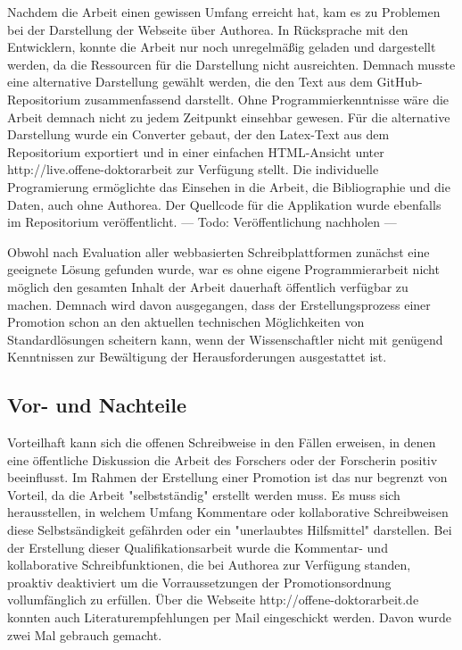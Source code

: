 Nachdem die Arbeit einen gewissen Umfang erreicht hat, kam es zu Problemen bei der Darstellung der Webseite über Authorea. In Rücksprache mit den Entwicklern, konnte die Arbeit nur noch unregelmäßig geladen und dargestellt werden, da die Ressourcen für die Darstellung nicht ausreichten. Demnach musste eine alternative Darstellung gewählt werden, die den Text aus dem GitHub-Repositorium zusammenfassend darstellt. Ohne Programmierkenntnisse wäre die Arbeit demnach nicht zu jedem Zeitpunkt einsehbar gewesen. Für die alternative Darstellung wurde ein Converter gebaut, der den Latex-Text aus dem Repositorium exportiert und in einer einfachen HTML-Ansicht unter http://live.offene-doktorarbeit zur Verfügung stellt. Die individuelle Programierung ermöglichte das Einsehen in die Arbeit, die Bibliographie und die Daten, auch ohne Authorea. Der Quellcode für die Applikation wurde ebenfalls im Repositorium veröffentlicht. --- Todo: Veröffentlichung nachholen ---

Obwohl nach Evaluation aller webbasierten Schreibplattformen zunächst eine geeignete Lösung gefunden wurde, war es ohne eigene Programmierarbeit nicht möglich den gesamten Inhalt der Arbeit dauerhaft öffentlich verfügbar zu machen. Demnach wird davon ausgegangen, dass der Erstellungsprozess einer Promotion schon an den aktuellen technischen Möglichkeiten von Standardlösungen scheitern kann, wenn der Wissenschaftler nicht mit genügend Kenntnissen zur Bewältigung der Herausforderungen ausgestattet ist.

\subsection{Vor- und Nachteile}

Vorteilhaft kann sich die offenen Schreibweise in den Fällen erweisen, in denen eine öffentliche Diskussion die Arbeit des Forschers oder der Forscherin positiv beeinflusst. Im Rahmen der Erstellung einer Promotion ist das nur begrenzt von Vorteil, da die Arbeit "selbstständig" erstellt werden muss. Es muss sich herausstellen, in welchem Umfang Kommentare oder kollaborative Schreibweisen diese Selbstsändigkeit gefährden oder ein "unerlaubtes Hilfsmittel" darstellen. Bei der Erstellung dieser Qualifikationsarbeit wurde die Kommentar- und kollaborative Schreibfunktionen, die bei Authorea zur Verfügung standen, proaktiv deaktiviert um die Vorraussetzungen der Promotionsordnung vollumfänglich zu erfüllen. Über die Webseite http://offene-doktorarbeit.de konnten auch Literaturempfehlungen per Mail eingeschickt werden. Davon wurde zwei Mal gebrauch gemacht.

